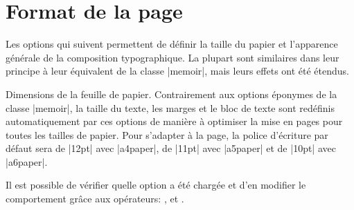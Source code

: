 
\section{Format de la page}

Les options qui suivent permettent de définir la taille du papier et l'apparence générale de la composition typographique. La plupart sont similaires dans leur principe à leur équivalent de la classe |memoir|, mais leurs effets ont été étendus.

Dimensions de la feuille de papier. Contrairement aux options éponymes de la classe |memoir|, la taille du texte, les marges et le bloc de texte sont redéfinis automatiquement par ces options de manière à optimiser la mise en pages pour toutes les tailles de papier. Pour s'adapter à la page, la police d'écriture par défaut sera de |12pt| avec |a4paper|, de |11pt| avec |a5paper| et de |10pt| avec |a6paper|.

\begin{developer}
Il est possible de vérifier quelle option a été chargée et d'en modifier le comportement grâce aux opérateurs: ,  et .
\end{developer}

\begin{noprint}
\end{noprint}

